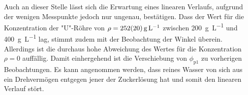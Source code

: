 		Auch an dieser Stelle lässt sich die Erwartung eines linearen Verlaufs, aufgrund der wenigen Messpunkte jedoch nur ungenau, bestätigen.
		Dass der Wert für die Konzentration der "U"-Röhre von $\rho = \SI{252+-20}{\gram\per\liter}$ zwischen \SI{200}{\gram\per\liter} und \SI{400}{\gram\per\liter} lag, stimmt zudem mit der Beobachtung der Winkel überein.
		Allerdings ist die durchaus hohe Abweichung des Wertes für die Konzentration $\rho = 0$ auffällig.
		Damit einhergehend ist die Verschiebung von $\phi_\text{p1}$ zu vorherigen Beobachtungen.
		Es kann angenommen werden, dass reines Wasser von sich aus ein Drehvermögen entgegen jener der Zuckerlösung hat und somit den linearen Verlauf stört.
		